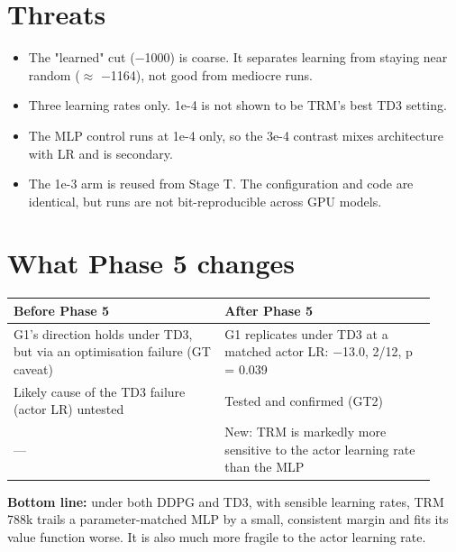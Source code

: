 \documentclass[11pt]{article}
\begin{document}
\section*{Threats}



\begin{itemize}
\item The "learned" cut ($-$1000) is coarse. It separates learning from staying near random ($\approx$ $-$1164), not good from mediocre runs.
\item Three learning rates only. 1e-4 is not shown to be TRM's best TD3 setting.
\item The MLP control runs at 1e-4 only, so the 3e-4 contrast mixes architecture with LR and is secondary.
\item The 1e-3 arm is reused from Stage T. The configuration and code are identical, but runs are not bit-reproducible across GPU models.
\end{itemize}



\section*{What Phase 5 changes}



\begin{center}\small\begin{tabular}{>{\raggedright\arraybackslash}p{0.467\linewidth}>{\raggedright\arraybackslash}p{0.467\linewidth}}
\toprule
Before Phase 5 & After Phase 5 \\
\midrule
G1's direction holds under TD3, but via an optimisation failure (GT caveat) & G1 replicates under TD3 at a matched actor LR: $-$13.0, 2/12, p = 0.039 \\
Likely cause of the TD3 failure (actor LR) untested & Tested and confirmed (GT2) \\
--- & New: TRM is markedly more sensitive to the actor learning rate than the MLP \\
\bottomrule
\end{tabular}\end{center}



\textbf{Bottom line:} under both DDPG and TD3, with sensible learning rates, TRM 788k trails a parameter-matched MLP by a small, consistent margin and fits its value function worse. It is also much more fragile to the actor learning rate.
\end{document}
